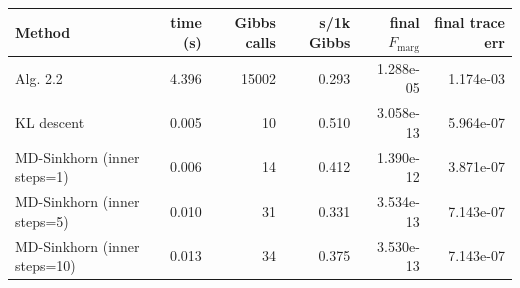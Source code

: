 \begin{tabular}{l r r r r r}
\hline
Method & time (s) & Gibbs calls & s/1k Gibbs & final $F_{\mathrm{marg}}$ & final trace err \\
\hline
Alg. 2.2 & 4.396 & 15002 & 0.293 & 1.288e-05 & 1.174e-03 \\
KL descent & 0.005 & 10 & 0.510 & 3.058e-13 & 5.964e-07 \\
MD-Sinkhorn (inner steps=1) & 0.006 & 14 & 0.412 & 1.390e-12 & 3.871e-07 \\
MD-Sinkhorn (inner steps=5) & 0.010 & 31 & 0.331 & 3.534e-13 & 7.143e-07 \\
MD-Sinkhorn (inner steps=10) & 0.013 & 34 & 0.375 & 3.530e-13 & 7.143e-07 \\
\hline
\end{tabular}